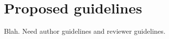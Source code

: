 \section{Proposed guidelines}\label{guidelines}

Blah. Need author guidelines and reviewer guidelines.